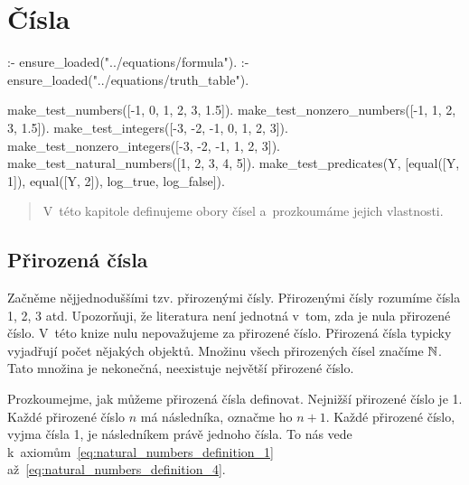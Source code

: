 \chapter{Čísla}

\begin{prolog}
:- ensure_loaded("../equations/formula").
:- ensure_loaded("../equations/truth_table").

make_test_numbers([-1, 0, 1, 2, 3, 1.5]).
make_test_nonzero_numbers([-1, 1, 2, 3, 1.5]).
make_test_integers([-3, -2, -1, 0, 1, 2, 3]).
make_test_nonzero_integers([-3, -2, -1, 1, 2, 3]).
make_test_natural_numbers([1, 2, 3, 4, 5]).
make_test_predicates(Y, [equal([Y, 1]), equal([Y, 2]), log_true, log_false]).
\end{prolog}


\begin{abstract}
V~této kapitole definujeme obory čísel a~prozkoumáme jejich vlastnosti.
\end{abstract}

\section{Přirozená čísla}

Začněme nějjednoduššími tzv. přirozenými čísly. Přirozenými čísly rozumíme čísla 1, 2, 3 atd. Upozorňuji, že literatura není jednotná v~tom, zda je nula přirozené číslo. V~této knize nulu nepovažujeme za přirozené číslo. Přirozená čísla typicky vyjadřují počet nějakých objektů. Množinu všech přirozených čísel značíme \(\mathbb{N}\). Tato množina je nekonečná, neexistuje největší přirozené číslo.

Prozkoumejme, jak můžeme přirozená čísla definovat. Nejnižší přirozené číslo je 1. Každé přirozené číslo \(n\) má
následníka, označme ho \(n + 1\). Každé přirozené číslo, vyjma čísla 1, je následníkem právě jednoho čísla. To nás vede k~axiomům~\eqref{eq:natural_numbers_definition_1} až~\eqref{eq:natural_numbers_definition_4}.

